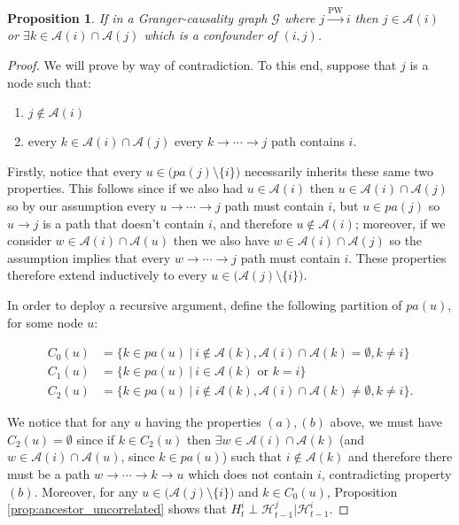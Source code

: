 \documentclass{statsoc}
\def\pwgc{\overset{\text{PW}}{\rightarrow}}  %
\def\gcg{\mathcal{G}}  %
\def\H{\mathcal{H}}  %
\newcommand{\pa}[1]{pa(#1)}  %
\newcommand{\anc}[1]{\mathcal{A}(#1)}  %
\newcommand{\gcgpath}[2]{#1 \rightarrow \cdots \rightarrow #2}  %
\newtheorem{proposition}{Proposition}
\def\H{\mathcal{H}}  %
\begin{document}
\begin{proposition}
  \label{prop:ancestor_properties}
  If in a Granger-causality graph $\gcg$ where $j \pwgc i$ then
  $j \in \anc{i}$ or $\exists k \in \anc{i} \cap\anc{j}$ which is a
  confounder of $(i, j)$.
\end{proposition}

\begin{proof}
  We will prove by way of contradiction.  To this end, suppose that
  $j$ is a node such that:

  \begin{enumerate}[label=(\alph*)]
    \item{$j \not \in \anc{i}$}
    \item{every $k \in \anc{i} \cap \anc{j}$ every
        $k \rightarrow \cdots \rightarrow j$ path contains $i$.}
  \end{enumerate}

  Firstly, notice that every $u \in \big(\pa{j} \setminus \{i\}\big)$
  necessarily inherits these same two properties.  This follows since
  if we also had $u \in \anc{i}$ then $u \in \anc{i} \cap \anc{j}$ so by our
  assumption every $u \rightarrow \cdots \rightarrow j$ path must contain
  $i$, but $u \in \pa{j}$ so $u \rightarrow j$ is a path that doesn't contain
  $i$, and therefore $u \not\in \anc{i}$; moreover, if we consider
  $w \in \anc{i} \cap \anc{u}$ then we also have
  $w \in \anc{i} \cap \anc{j}$ so the assumption implies that every
  $w \rightarrow \cdots \rightarrow j$ path must contain $i$.  These properties therefore
  extend inductively to every $u \in \big(\anc{j} \setminus \{i\}\big)$.

  In order to deploy a recursive argument, define the following
  partition of $\pa{u}$, for some node $u$:

  \begin{align*}
    C_0(u) &= \{k \in \pa{u}\ |\ i \not\in \anc{k}, \anc{i} \cap \anc{k} = \emptyset, k \ne i\}\\
    C_1(u) &= \{k \in \pa{u}\ |\ i \in \anc{k} \text{ or } k = i\}\\
    C_2(u) &= \{k \in \pa{u}\ |\ i \not\in \anc{k}, \anc{i} \cap \anc{k} \ne \emptyset, k \ne i\}.
  \end{align*}

  We notice that for any $u$ having the properties $(a), (b)$ above,
  we must have $C_2(u) = \emptyset$ since if $k \in C_2(u)$ then
  $\exists w \in \anc{i} \cap \anc{k}$ (and
  $w \in \anc{i} \cap \anc{u}$, since $k \in \pa{u}$) such that
  $i \not \in \anc{k}$ and therefore there must be a path
  $\gcgpath{w}{k} \rightarrow u$ which does not contain $i$,
  contradicting property $(b)$.  Moreover, for any
  $u \in \big(\anc{j} \setminus \{i\}\big)$ and $k \in C_0(u)$,
  Proposition \ref{prop:ancestor_uncorrelated} shows that
  $H_t^i \perp \H_{t - 1}^j | \H_{t - 1}^i$.


\end{proof}
\end{document}
